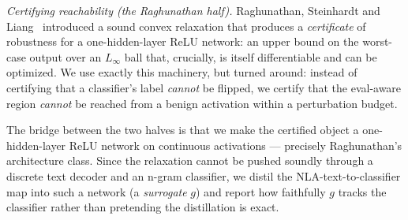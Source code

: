 \emph{Certifying reachability (the Raghunathan half).} Raghunathan, Steinhardt and
Liang~\cite{raghunathan2018certified,raghunathan2018sdp} introduced a sound convex
relaxation that produces a \emph{certificate} of robustness for a one-hidden-layer
ReLU network: an upper bound on the worst-case output over an $L_\infty$ ball that,
crucially, is itself differentiable and can be optimized. We use exactly this
machinery, but turned around: instead of certifying that a classifier's label
\emph{cannot} be flipped, we certify that the eval-aware region \emph{cannot} be
reached from a benign activation within a perturbation budget.

The bridge between the two halves is that we make the certified object a
one-hidden-layer ReLU network on continuous activations --- precisely Raghunathan's
architecture class. Since the relaxation cannot be pushed soundly through a
discrete text decoder and an n-gram classifier, we distil the NLA-text-to-classifier
map into such a network (a \emph{surrogate} $g$) and report how faithfully $g$
tracks the classifier rather than pretending the distillation is exact.

